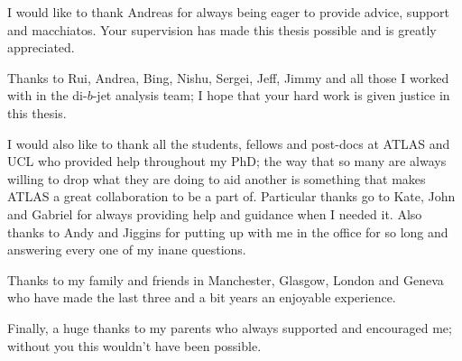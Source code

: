 \begin{acknowledgements}

I would like to thank Andreas for always being eager to provide advice, support and macchiatos.
Your supervision has made this thesis possible and is greatly appreciated.

Thanks to Rui, Andrea, Bing, Nishu, Sergei, Jeff, Jimmy and all those I worked with in the di-$b$-jet analysis team;
I hope that your hard work is given justice in this thesis.

I would also like to thank all the students, fellows and post-docs at ATLAS and UCL who provided help throughout my PhD;
the way that so many are always willing to drop what they are doing to aid another is something that makes ATLAS a great collaboration to be a part of.
Particular thanks go to Kate, John and Gabriel for always providing help and guidance when I needed it.
Also thanks to Andy and Jiggins for putting up with me in the office for so long and answering every one of my inane questions.

Thanks to my family and friends in Manchester, Glasgow, London and Geneva who have made the last three and a bit years an enjoyable experience.

Finally, a huge thanks to my parents who always supported and encouraged me;
without you this wouldn't have been possible. 

\end{acknowledgements}

\setcounter{tocdepth}{2} 

\tableofcontents
\listoffigures
\listoftables

